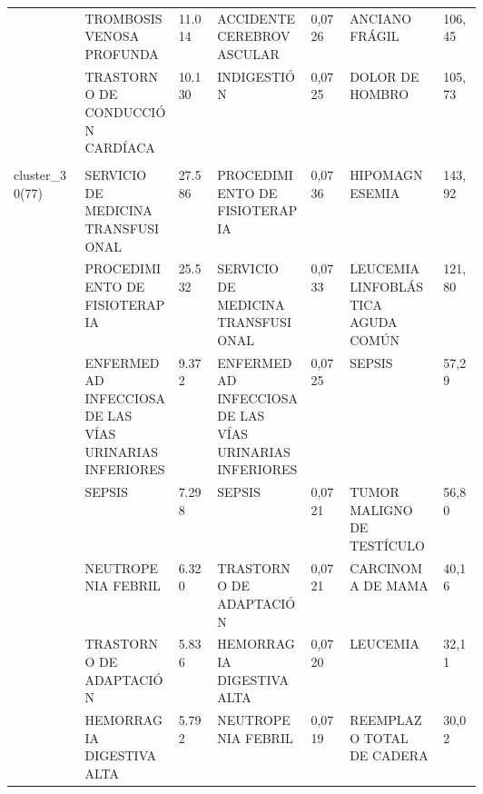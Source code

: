 \begin{landscape}
\begin{longtable}[c]{@{}lp{0.2\linewidth}lp{0.2\linewidth}lp{0.2\linewidth}l@{}}
                                  & TROMBOSIS VENOSA PROFUNDA                                     & 11.014 & ACCIDENTE CEREBROVASCULAR                              & 0,0726 & ANCIANO FRÁGIL                                                & 106,45   \\
                                  & TRASTORNO DE CONDUCCIÓN CARDÍACA                              & 10.130 & INDIGESTIÓN                                            & 0,0725 & DOLOR DE HOMBRO                                               & 105,73   \\ \\
\multirow{10}{*}{cluster\_30(77)} & SERVICIO DE MEDICINA TRANSFUSIONAL                            & 27.586 & PROCEDIMIENTO DE FISIOTERAPIA                          & 0,0736 & HIPOMAGNESEMIA                                                & 143,92   \\
                                  & PROCEDIMIENTO DE FISIOTERAPIA                                 & 25.532 & SERVICIO DE MEDICINA TRANSFUSIONAL                     & 0,0733 & LEUCEMIA LINFOBLÁSTICA AGUDA COMÚN                            & 121,80   \\
                                  & ENFERMEDAD INFECCIOSA DE LAS VÍAS URINARIAS INFERIORES        & 9.372  & ENFERMEDAD INFECCIOSA DE LAS VÍAS URINARIAS INFERIORES & 0,0725 & SEPSIS                                                        & 57,29    \\
                                  & SEPSIS                                                        & 7.298  & SEPSIS                                                 & 0,0721 & TUMOR MALIGNO DE TESTÍCULO                                    & 56,80    \\
                                  & NEUTROPENIA FEBRIL                                            & 6.320  & TRASTORNO DE ADAPTACIÓN                                & 0,0721 & CARCINOMA DE MAMA                                             & 40,16    \\
                                  & TRASTORNO DE ADAPTACIÓN                                       & 5.836  & HEMORRAGIA DIGESTIVA ALTA                              & 0,0720 & LEUCEMIA                                                      & 32,11    \\
                                  & HEMORRAGIA DIGESTIVA ALTA                                     & 5.792  & NEUTROPENIA FEBRIL                                     & 0,0719 & REEMPLAZO TOTAL DE CADERA                                     & 30,02    \\

\end{longtable}
\end{landscape}
